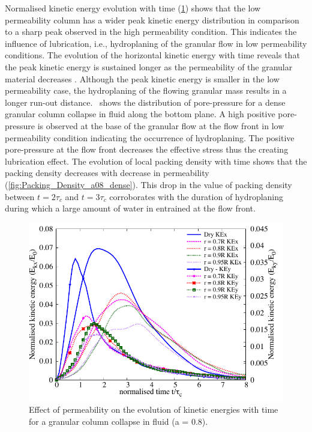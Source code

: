 \documentclass[12pt,a4paper,twocolumn,fleqn]{narms}
\begin{document}
Normalised kinetic energy evolution with time (\cref{fig:KExy_a08_dense}) shows that the 
low permeability column has a wider peak kinetic energy distribution in 
comparison to a sharp peak observed in the high permeability condition. This 
indicates the influence of lubrication, i.e., hydroplaning of the granular flow 
in low permeability conditions. The evolution of the horizontal kinetic energy 
with time reveals that the peak kinetic energy is sustained longer as the 
permeability of the granular material decreases . 
Although the peak kinetic energy is smaller in the low permeability case, the 
hydroplaning of the flowing granular mass results in a longer run-out 
distance.~ shows the 
distribution of pore-pressure for a dense granular column collapse in fluid 
along the bottom plane. A high positive pore-pressure is observed 
at the base of the granular flow at the flow front in low permeability 
condition indicating the occurrence of hydroplaning. The positive pore-pressure 
at the flow front decreases the effective stress thus the creating lubrication 
effect. The evolution of local packing density with time shows that the packing 
density decreases with decrease in permeability 
(\cref{fig:Packing_Density_a08_dense}). This drop 
in the value of packing density between $t = 2\tau_c$ and $t=3\tau_c$ 
corroborates with the duration of hydroplaning during which a large amount of 
water in entrained at the flow front.


\begin{figure}
    \includegraphics[width=\linewidth]{figs/KExy_a08_dense}
    \caption{Effect of permeability on the evolution of kinetic energies with time 
for a granular column collapse in fluid (a = 0.8).}
    \label{fig:KExy_a08_dense}
\end{figure}
\end{document}
